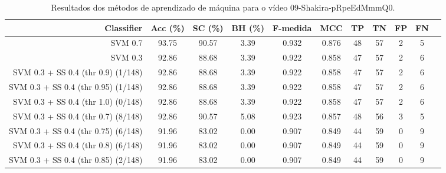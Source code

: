 \begin{table}[!htb]
\centering
\caption{Resultados dos métodos de aprendizado de máquina para o vídeo 09-Shakira-pRpeEdMmmQ0.}
\label{tab:09-Shakira-pRpeEdMmmQ0}
\begin{tabular}{r|c|c|c|c|c|c|c|c|c|c}
\hline\hline
Classifier & Acc (\%) & SC (\%) & BH (\%) & F-medida & MCC & TP & TN & FP & FN \\ \hline
SVM 0.7 & 93.75 & 90.57 & 3.39 & 0.932 & 0.876 & 48 & 57 & 2 & 5 \\ 
SVM 0.3 & 92.86 & 88.68 & 3.39 & 0.922 & 0.858 & 47 & 57 & 2 & 6 \\ 
SVM 0.3 + SS 0.4 (thr 0.9) (1/148) & 92.86 & 88.68 & 3.39 & 0.922 & 0.858 & 47 & 57 & 2 & 6 \\ 
SVM 0.3 + SS 0.4 (thr 0.95) (1/148) & 92.86 & 88.68 & 3.39 & 0.922 & 0.858 & 47 & 57 & 2 & 6 \\ 
SVM 0.3 + SS 0.4 (thr 1.0) (0/148) & 92.86 & 88.68 & 3.39 & 0.922 & 0.858 & 47 & 57 & 2 & 6 \\ 
SVM 0.3 + SS 0.4 (thr 0.7) (8/148) & 92.86 & 90.57 & 5.08 & 0.923 & 0.857 & 48 & 56 & 3 & 5 \\ 
SVM 0.3 + SS 0.4 (thr 0.75) (6/148) & 91.96 & 83.02 & 0.00 & 0.907 & 0.849 & 44 & 59 & 0 & 9 \\ 
SVM 0.3 + SS 0.4 (thr 0.8) (6/148) & 91.96 & 83.02 & 0.00 & 0.907 & 0.849 & 44 & 59 & 0 & 9 \\ 
SVM 0.3 + SS 0.4 (thr 0.85) (2/148) & 91.96 & 83.02 & 0.00 & 0.907 & 0.849 & 44 & 59 & 0 & 9 \\ 
\hline\hline
\end{tabular}
\end{table}

